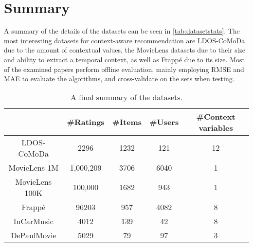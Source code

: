 \section{Summary}\label{sec:datasetsummary}
A summary of the details of the datasets can be seen in \autoref{tab:datasetstats}.
The most interesting datasets for context-aware recommendation are LDOS-CoMoDa due to the amount of contextual values, the MovieLens datasets due to their size and ability to extract a temporal context, as well as Frappé due to its size.
Most of the examined papers perform offline evaluation, mainly employing RMSE and MAE to evaluate the algorithms, and cross-validate on the sets when testing.

\begin{table*}
    \centering
    \begin{tabular}{|c|c|c|c|c|} 
    \hline
               & \#Ratings & \#Items & \#Users & \#Context variables  \\ 
    \hline
    LDOS-CoMoDa    & 2296      & 1232    & 121     & 12                   \\ 
    \hline
    MovieLens 1M   & 1,000,209 & 3706    & 6040    & 1                    \\ 
    \hline
    MovieLens 100K & 100,000   & 1682    & 943     & 1                    \\ 
    \hline
    Frappé         & 96203     & 957     & 4082    & 8                    \\ 
    \hline
    InCarMusic     & 4012      & 139     & 42      & 8                    \\ 
    \hline
    DePaulMovie    & 5029      & 79      & 97      & 3                    \\
    \hline
    \end{tabular}
    \caption{A final summary of the datasets.}
    \label{tab:datasetstats}
\end{table*}
